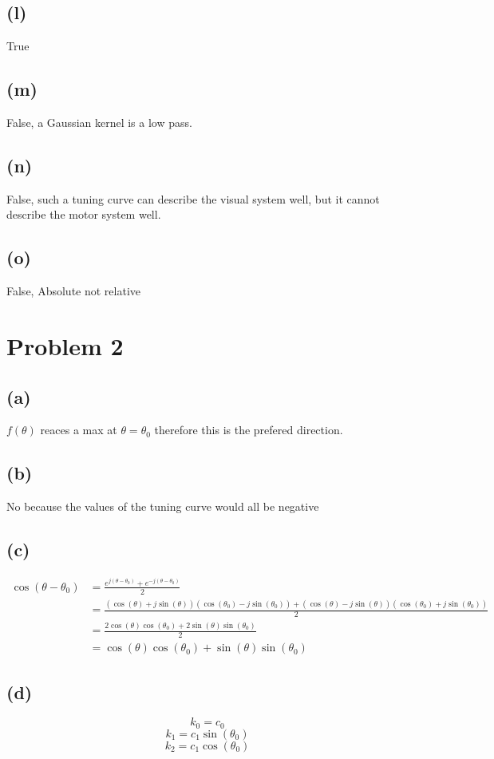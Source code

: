 \documentclass[12pt]{article}
\begin{document}
\subsection*{(l)}
True
\subsection*{(m)}
False, a Gaussian kernel is a low pass.
\subsection*{(n)}
False, such a tuning curve can describe the visual system well, but it cannot describe the motor system well.
\subsection*{(o)}
False, Absolute not relative


\section*{Problem 2}
\subsection*{(a)}
$f(\theta)$ reaces a max at $\theta=\theta_0$ therefore this
is the prefered direction.
\subsection*{(b)}
No because the values of the tuning curve would all be negative
\subsection*{(c)}
\begin{align*}
    \cos(\theta-\theta_0)&=\frac{e^{j(\theta-\theta_0)}+e^{-j(\theta-\theta_0)}}{2}\\
    &=\frac{(\cos(\theta)+j\sin(\theta))(\cos(\theta_0)-j\sin(\theta_0))+(\cos(\theta)-j\sin(\theta))(\cos(\theta_0)+j\sin(\theta_0))}{2}\\
    &=\frac{2\cos(\theta)\cos(\theta_0)+2\sin(\theta)\sin(\theta_0)}{2}\\
    &=\cos(\theta)\cos(\theta_0)+\sin(\theta)\sin(\theta_0)
\end{align*}
\subsection*{(d)}
$$k_0=c_0$$
$$k_1=c_1\sin(\theta_0)$$
$$k_2=c_1\cos(\theta_0)$$
\end{document}
